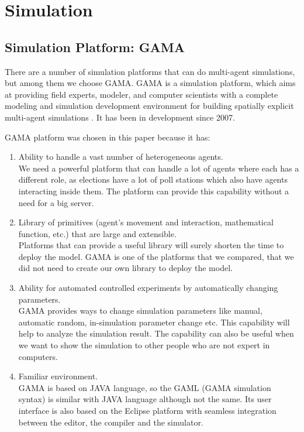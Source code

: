\documentclass[JIP]{ipsj}
\begin{document}
\section{Simulation}
\subsection{Simulation Platform: GAMA}

There are a number of simulation platforms that can do multi-agent simulations, but among them we choose GAMA. GAMA is a simulation platform, which aims at providing field experts, modeler, and computer scientists with a complete modeling and simulation development environment for building spatially explicit multi-agent simulations \cite{GAMAplatform}. It has been in development since 2007.

GAMA platform was chosen in this paper because it has:
\begin{enumerate}%
\item Ability to handle a vast number of heterogeneous agents.\\
We need a powerful platform that can handle a lot of agents where each has a different role, as elections have a lot of poll stations which also have agents interacting inside them. The platform can provide this capability without a need for a big server.

\item Library of primitives (agent's movement and interaction, mathematical function, etc.) that are large and extensible.\\
Platforms that can provide a useful library will surely shorten the time to deploy the model. GAMA is one of the platforms that we compared, that we did not need to create our own library to deploy the model.

\item Ability for automated controlled experiments by automatically changing parameters.\\
GAMA provides ways to change simulation parameters like manual, automatic random, in-simulation parameter change etc. This capability will help to analyze the simulation result. The capability can also be useful when we want to show the simulation to other people who are not expert in computers.

\item Familiar environment.\\
GAMA is based on JAVA language, so the GAML (GAMA simulation syntax) is similar with JAVA language although not the same. Its user interface is also based on the Eclipse platform with seamless integration between the editor, the compiler and the simulator.
\end{enumerate}%
\end{document}

